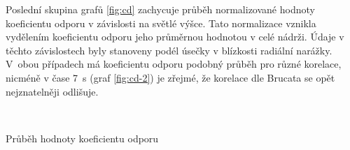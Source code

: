 Poslední skupina grafů \ref{fig:cd} zachycuje průběh normalizované hodnoty koeficientu odporu v závislosti na světlé výšce. Tato normalizace vznikla vydělením koeficientu odporu jeho průměrnou hodnotou v celé nádrži. Údaje v těchto závislostech byly stanoveny podél úsečky v blízkosti radiální narážky.  V~obou případech má  koeficientu odporu podobný průběh pro různé korelace, nicméně v čase \SI{7}{\second} (graf \ref{fig:cd-2}) je zřejmé, že korelace dle Brucata se opět nejznatelněji odlišuje.

\begin{grf}[h!]
 \centering
  \\ 
  \caption{Průběh hodnoty koeficientu odporu}
  \label{fig:cd}
\end{grf}
\newpage

